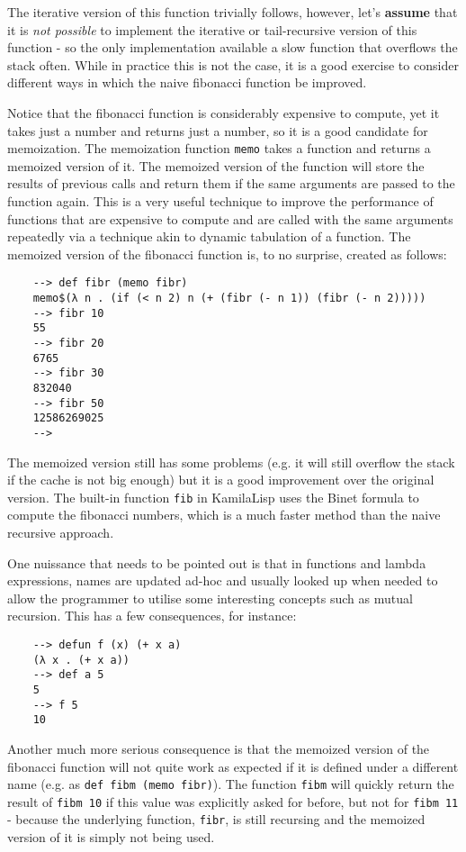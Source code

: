 The iterative version of this function trivially follows, however, let's \textbf{assume} that it is \textit{not possible} to implement the iterative or tail-recursive version of this function - so the only implementation available a slow function that overflows the stack often. While in practice this is not the case, it is a good exercise to consider different ways in which the naive fibonacci function be improved.

Notice that the fibonacci function is considerably expensive to compute, yet it takes just a number and returns just a number, so it is a good candidate for memoization. The memoization function \verb|memo| takes a function and returns a memoized version of it. The memoized version of the function will store the results of previous calls and return them if the same arguments are passed to the function again. This is a very useful technique to improve the performance of functions that are expensive to compute and are called with the same arguments repeatedly via a technique akin to dynamic tabulation of a function. The memoized version of the fibonacci function is, to no surprise, created as follows:

\begin{Verbatim}
    --> def fibr (memo fibr)
    memo$(λ n . (if (< n 2) n (+ (fibr (- n 1)) (fibr (- n 2)))))
    --> fibr 10
    55
    --> fibr 20
    6765
    --> fibr 30
    832040
    --> fibr 50
    12586269025
    -->
\end{Verbatim}

The memoized version still has some problems (e.g. it will still overflow the stack if the cache is not big enough) but it is a good improvement over the original version. The built-in function \verb|fib| in KamilaLisp uses the Binet formula to compute the fibonacci numbers, which is a much faster method than the naive recursive approach.

One nuissance that needs to be pointed out is that in functions and lambda expressions, names are updated ad-hoc and usually looked up when needed to allow the programmer to utilise some interesting concepts such as mutual recursion. This has a few consequences, for instance:

\begin{Verbatim}
    --> defun f (x) (+ x a)
    (λ x . (+ x a))
    --> def a 5
    5
    --> f 5
    10
\end{Verbatim}

Another much more serious consequence is that the memoized version of the fibonacci function will not quite work as expected if it is defined under a different name (e.g. as \verb|def fibm (memo fibr)|). The function \verb|fibm| will quickly return the result of \verb|fibm 10| if this value was explicitly asked for before, but not for \verb|fibm 11| - because the underlying function, \verb|fibr|, is still recursing and the memoized version of it is simply not being used.

